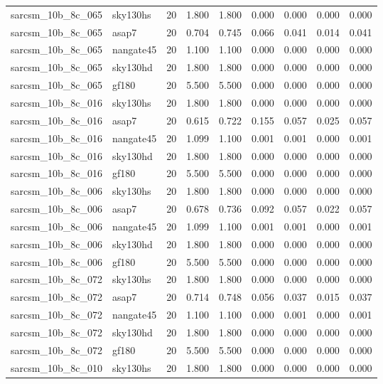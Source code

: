 \begin{tabular}{llrrrrrrr}
sarcsm\_10b\_8c\_065 & sky130hs & 20 & 1.800 & 1.800 & 0.000 & 0.000 & 0.000 & 0.000 \\
sarcsm\_10b\_8c\_065 & asap7 & 20 & 0.704 & 0.745 & 0.066 & 0.041 & 0.014 & 0.041 \\
sarcsm\_10b\_8c\_065 & nangate45 & 20 & 1.100 & 1.100 & 0.000 & 0.000 & 0.000 & 0.000 \\
sarcsm\_10b\_8c\_065 & sky130hd & 20 & 1.800 & 1.800 & 0.000 & 0.000 & 0.000 & 0.000 \\
sarcsm\_10b\_8c\_065 & gf180 & 20 & 5.500 & 5.500 & 0.000 & 0.000 & 0.000 & 0.000 \\
sarcsm\_10b\_8c\_016 & sky130hs & 20 & 1.800 & 1.800 & 0.000 & 0.000 & 0.000 & 0.000 \\
sarcsm\_10b\_8c\_016 & asap7 & 20 & 0.615 & 0.722 & 0.155 & 0.057 & 0.025 & 0.057 \\
sarcsm\_10b\_8c\_016 & nangate45 & 20 & 1.099 & 1.100 & 0.001 & 0.001 & 0.000 & 0.001 \\
sarcsm\_10b\_8c\_016 & sky130hd & 20 & 1.800 & 1.800 & 0.000 & 0.000 & 0.000 & 0.000 \\
sarcsm\_10b\_8c\_016 & gf180 & 20 & 5.500 & 5.500 & 0.000 & 0.000 & 0.000 & 0.000 \\
sarcsm\_10b\_8c\_006 & sky130hs & 20 & 1.800 & 1.800 & 0.000 & 0.000 & 0.000 & 0.000 \\
sarcsm\_10b\_8c\_006 & asap7 & 20 & 0.678 & 0.736 & 0.092 & 0.057 & 0.022 & 0.057 \\
sarcsm\_10b\_8c\_006 & nangate45 & 20 & 1.099 & 1.100 & 0.001 & 0.001 & 0.000 & 0.001 \\
sarcsm\_10b\_8c\_006 & sky130hd & 20 & 1.800 & 1.800 & 0.000 & 0.000 & 0.000 & 0.000 \\
sarcsm\_10b\_8c\_006 & gf180 & 20 & 5.500 & 5.500 & 0.000 & 0.000 & 0.000 & 0.000 \\
sarcsm\_10b\_8c\_072 & sky130hs & 20 & 1.800 & 1.800 & 0.000 & 0.000 & 0.000 & 0.000 \\
sarcsm\_10b\_8c\_072 & asap7 & 20 & 0.714 & 0.748 & 0.056 & 0.037 & 0.015 & 0.037 \\
sarcsm\_10b\_8c\_072 & nangate45 & 20 & 1.100 & 1.100 & 0.000 & 0.001 & 0.000 & 0.001 \\
sarcsm\_10b\_8c\_072 & sky130hd & 20 & 1.800 & 1.800 & 0.000 & 0.000 & 0.000 & 0.000 \\
sarcsm\_10b\_8c\_072 & gf180 & 20 & 5.500 & 5.500 & 0.000 & 0.000 & 0.000 & 0.000 \\
sarcsm\_10b\_8c\_010 & sky130hs & 20 & 1.800 & 1.800 & 0.000 & 0.000 & 0.000 & 0.000 \\

\end{tabular}
